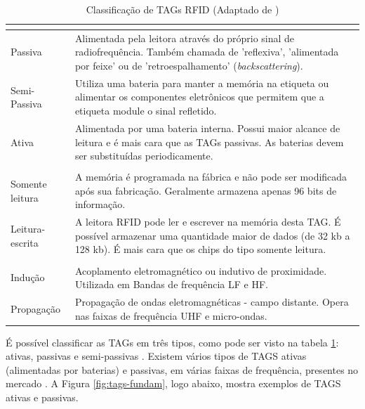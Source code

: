  
\begin{table}[H]
\centering
\caption{Classificação de TAGs RFID (Adaptado de \cite{AhmedIntegrationStreamMapping})}
\label{tab:comparativoTags}
\begin{tabular}{p{3cm}p{9cm}}
\hline
\multicolumn{2}{c}{\cellcolor{lightgray}{Origem da alimentação elétrica}} \\ \hline
Passiva         &   Alimentada pela leitora através do próprio sinal de radiofrequência. Também chamada de 'reflexiva', 'alimentada por feixe' ou de 'retroespalhamento' (\textit{backscattering}).     \\ \hline
Semi-Passiva    &   Utiliza uma bateria para manter a memória na etiqueta ou alimentar os componentes eletrônicos que permitem que a etiqueta module o sinal refletido.    \\ \hline
Ativa           &   Alimentada por uma bateria interna. Possui maior alcance de leitura e é mais cara que as TAGs passivas. As baterias devem ser substituídas periodicamente.    \\ \hline
\multicolumn{2}{c}{\cellcolor{lightgray}{Tipo de Memória}} \\ \hline
Somente leitura       &   A memória é programada na fábrica e não pode ser modificada após sua fabricação. Geralmente armazena apenas 96 bits de informação.       \\ \hline
Leitura-escrita    &   A leitora RFID pode ler e escrever na memória desta TAG. É possível armazenar uma quantidade maior de dados (de 32 kb a 128 kb). É mais cara que os chips do tipo somente leitura.   \\ \hline
\multicolumn{2}{c}{\cellcolor{lightgray}{Tipo de Comunicação entre a TAG e a Leitora}} \\ \hline
Indução       &   Acoplamento eletromagnético ou indutivo de proximidade. Utilizada em Bandas de frequência LF e HF.       \\ \hline
Propagação    &   Propagação de ondas eletromagnéticas - campo distante. Opera nas faixas de frequência UHF e micro-ondas.   \\ \hline
\end{tabular}
\end{table}



É possível classificar as TAGs em três tipos, como pode ser visto na tabela \ref{tab:comparativoTags}: ativas, passivas e semi-passivas \cite{chawla2007overview}.  Existem vários tipos de TAGS ativas (alimentadas por baterias) e passivas, em várias faixas de frequência, presentes no mercado \cite{rao1999overview}. A Figura \ref{fig:tags-fundam}, logo abaixo, mostra exemplos de TAGS ativas e passivas.



